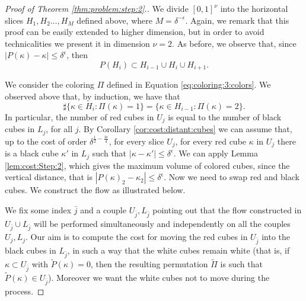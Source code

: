 \documentclass[12 pt]{article}
\theoremstyle{definition} \newtheorem{definition}{Definition}[section]
\theoremstyle{definition} \newtheorem{remark}[definition]{Remark}
\theoremstyle{plain} \newtheorem{lemma}[definition]{Lemma}
\theoremstyle{plain} \newtheorem{proposition}[definition]{Proposition}
\theoremstyle{plain} \newtheorem{theorem}[definition]{Theorem}
\theoremstyle{plain} \newtheorem{corollary}[definition]{Corollary}
\theoremstyle{definition} \newtheorem{example}[definition]{Example}
\theoremstyle{definition} \newtheorem{assumption}[definition]{Assumption}
\theoremstyle{definition} \newtheorem{conjecture}[definition]{Conjecture}
\newcommand{\1}{\mathbbm 1}
\numberwithin{equation}{section}
\begin{document}
\begin{proof}[Proof of Theorem \ref{thm:problem:step:2}.]
We divide $[0,1]^\nu$ into the horizontal slices $H_1,H_2\dots, H_M$ defined above, where $M=\delta^{-\epsilon}$. Again, we remark that this proof can be easily extended to higher dimension, but in order to avoid technicalities we present it in dimension $\nu=2$. As before, we observe that, since $|P(\kappa)-\kappa|\leq \delta^\epsilon$, then 
\begin{equation*}
    P(H_i)\subset H_{i-1}\cup H_{i}\cup H_{i+1}.
\end{equation*}

We consider the coloring $\Pi$ defined in Equation \eqref{eq:coloring:3:colors}. We observed above that, by induction, we have that 
\begin{equation*}
    \sharp \lbrace \kappa\in H_i: \Pi(\kappa)=1\rbrace=\lbrace \kappa\in H_{i-1}:\Pi(\kappa)=2\rbrace.
\end{equation*}
In particular, the number of red cubes in $U_j$ is equal to the number of black cubes in $L_j$, for all $j$.  
By Corollary \ref{cor:cost:distant:cubes} we can assume that, up to the cost of order $\delta^{\frac{1}{2}-\frac{3\epsilon}{4}}$, for every slice $U_j$, for every red cube $\kappa$ in $U_j$ there is a black cube $\kappa'$ in $L_j$ such that $|\kappa-\kappa'|\leq \delta^{\epsilon}.$ We can apply Lemma \ref{lem:cost:Step:2}, which gives the maximum volume of colored cubes, since the vertical distance, that is $|P(\kappa)_2-\kappa_2|\leq \delta^\epsilon$. Now we need to swap red and black cubes. We construct the flow as illustrated below.

\medskip

We fix some index $\bar j$ and a couple $U_{\bar j}, L_{\bar j}$ pointing out that the flow constructed in $U_{\bar j}\cup L_{\bar j}$ will be performed simultaneously and independently on all the couples $U_j, L_j$. Our aim is to compute the cost for moving the red cubes in $U_{\bar j}$ into the black cubes in $L_{\bar j}$, in such a way that the white cubes remain white (that is, if $\kappa\subset U_{\bar j}$ with $\tilde P(\kappa)=0$, then the resulting permutation $\tilde\Pi$ is such that $\tilde P(\kappa)\in U_{\bar j}$). Moreover we want the white cubes not to move during the process. 



\end{proof}
\end{document}
